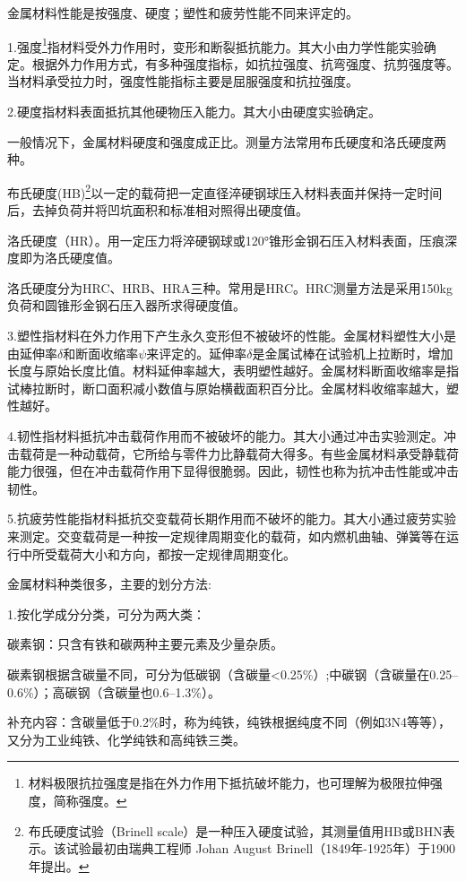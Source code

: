 \documentclass{ctexbook}
\begin{document}
金属材料性能是按强度、硬度；塑性和疲劳性能不同来评定的。

1.强度\footnote{材料极限抗拉强度是指在外力作用下抵抗破坏能力，也可理解为极限拉伸强度，简称强度。}指材料受外力作用时，变形和断裂抵抗能力。其大小由力学性能实验确定。根据外力作用方式，有多种强度指标，如抗拉强度、抗弯强度、抗剪强度等。当材料承受拉力时，强度性能指标主要是屈服强度和抗拉强度。

2.硬度指材料表面抵抗其他硬物压入能力。其大小由硬度实验确定。

一般情况下，金属材料硬度和强度成正比。测量方法常用布氏硬度和洛氏硬度两种。

布氏硬度(HB)\footnote{布氏硬度试验（Brinell scale）是一种压入硬度试验，其测量值用HB或BHN表示。该试验最初由瑞典工程师 Johan August Brinell（1849年-1925年）于1900年提出。}以一定的载荷把一定直径淬硬钢球压入材料表面并保持一定时间后，去掉负荷并将凹坑面积和标准相对照得出硬度值。

洛氏硬度（HR）。用一定压力将淬硬钢球或120°锥形金钢石压入材料表面，压痕深度即为洛氏硬度值。

洛氏硬度分为HRC、HRB、HRA三种。常用是HRC。HRC测量方法是采用150kg负荷和圆锥形金钢石压入器所求得硬度值。

3.塑性指材料在外力作用下产生永久变形但不被破坏的性能。金属材料塑性大小是由延伸率$\delta$和断面收缩率$\psi$来评定的。延伸率$\delta$是金属试棒在试验机上拉断时，增加长度与原始长度比值。材料延伸率越大，表明塑性越好。金属材料断面收缩率是指试棒拉断时，断口面积减小数值与原始横截面积百分比。金属材料收缩率越大，塑性越好。

4.韧性指材料抵抗冲击载荷作用而不被破坏的能力。其大小通过冲击实验测定。冲击载荷是一种动载荷，它所给与零件力比静载荷大得多。有些金属材料承受静载荷能力很强，但在冲击载荷作用下显得很脆弱。因此，韧性也称为抗冲击性能或冲击韧性。

5.抗疲劳性能指材料抵抗交变载荷长期作用而不破坏的能力。其大小通过疲劳实验来测定。交变载荷是一种按一定规律周期变化的载荷，如内燃机曲轴、弹簧等在运行中所受载荷大小和方向，都按一定规律周期变化。

金属材料种类很多，主要的划分方法:

1.按化学成分分类，可分为两大类：

碳素钢：只含有铁和碳两种主要元素及少量杂质。

碳素钢根据含碳量不同，可分为低碳钢（含碳量<0.25\%）;中碳钢（含碳量在0.25--0.6\%）；高碳钢（含碳量也0.6--1.3\%）。

补充内容：含碳量低于0.2\%时，称为纯铁，纯铁根据纯度不同（例如3N4等等），又分为工业纯铁、化学纯铁和高纯铁三类。
\end{document}

